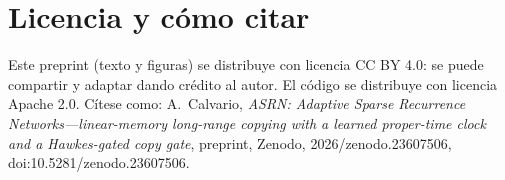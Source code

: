\documentclass[11pt]{article}
\def\zenododoi{10.5281/zenodo.23607506}
\begin{document}
\section*{Licencia y cómo citar}
Este preprint (texto y figuras) se distribuye con licencia CC BY 4.0: se puede compartir y adaptar dando crédito al
autor. El código se distribuye con licencia Apache 2.0. Cítese como: A.~Calvario, \emph{ASRN: Adaptive Sparse
Recurrence Networks---linear-memory long-range copying with a learned proper-time clock and a Hawkes-gated copy gate},
preprint, Zenodo, 2026\ifx\zenododoi\empty\else, doi:\zenododoi\fi.

{\footnotesize\setlength{\bibsep}{1pt plus 1pt}

}
\end{document}

